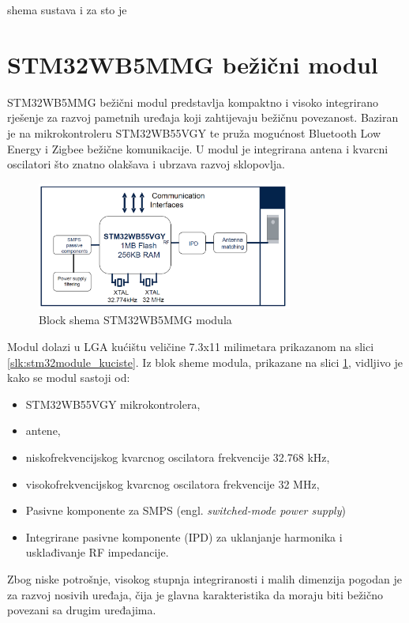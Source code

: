 \documentclass[../diplomski_rad.tex]{subfiles}
\begin{document}
\sloppy

\justifying

shema sustava i za sto je

\section{STM32WB5MMG bežični modul}

STM32WB5MMG bežični modul predstavlja kompaktno i visoko integrirano rješenje za razvoj pametnih uređaja koji zahtijevaju bežičnu povezanost. 
Baziran je na mikrokontroleru STM32WB55VGY te pruža mogućnost Bluetooth Low Energy i Zigbee bežične komunikacije. 
U modul je integrirana antena i kvarcni oscilatori što znatno olakšava i ubrzava razvoj sklopovlja.  

\begin{figure}[htb]
    \centering
    \includegraphics[width=0.75\textwidth]{Figures/stm32module.png} 
    \caption{Block shema STM32WB5MMG modula \cite{stm32module}}
    \label{slk:stm32module}
\end{figure}

Modul dolazi u LGA kućištu veličine 7.3x11 milimetara prikazanom na slici \ref{slk:stm32module_kuciste}. 
Iz blok sheme modula, prikazane na slici \ref{slk:stm32module}, 
vidljivo je kako se modul sastoji od:
\begin{itemize}
    \item STM32WB55VGY mikrokontrolera,
    \item antene,
    \item niskofrekvencijskog kvarcnog oscilatora frekvencije 32.768 kHz,
    \item visokofrekvencijskog kvarcnog oscilatora frekvencije 32 MHz,
    \item Pasivne komponente za SMPS (engl. \textit{switched-mode power supply}) 
    \item Integrirane pasivne komponente (IPD) za uklanjanje harmonika i usklađivanje RF impedancije.     
  \end{itemize} 
Zbog niske potrošnje, visokog stupnja integriranosti i malih dimenzija pogodan je za razvoj nosivih uređaja, 
čija je glavna karakteristika da moraju biti bežično povezani sa drugim uređajima. 
\end{document}
